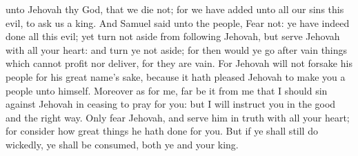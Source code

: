 unto Jehovah thy God, that we die not; for we have added unto all our sins this evil, to ask us a king. And Samuel said unto the people, Fear not: ye have indeed done all this evil; yet turn not aside from following Jehovah, but serve Jehovah with all your heart: and turn ye not aside; for then would ye go after vain things which cannot profit nor deliver, for they are vain. For Jehovah will not forsake his people for his great name’s sake, because it hath pleased Jehovah to make you a people unto himself. Moreover as for me, far be it from me that I should sin against Jehovah in ceasing to pray for you: but I will instruct you in the good and the right way. Only fear Jehovah, and serve him in truth with all your heart; for consider how great things he hath done for you. But if ye shall still do wickedly, ye shall be consumed, both ye and your king. 

